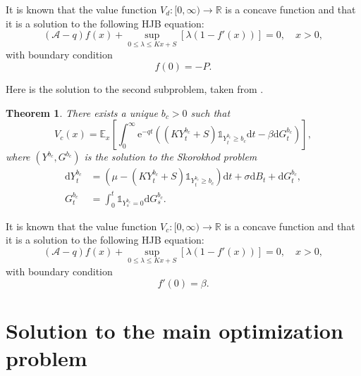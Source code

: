 \documentclass[11pt,reqno]{amsart}
\newtheorem{theorem}{Theorem}[section]
\newcommand{\E}{\mathbb{E}}
\newcommand{\e}{\mathrm{e}}
\newcommand{\reals}{\mathbb{R}}
\newcommand{\ind}{\mathds{1}}
\newcommand{\diff}{\mathrm{d}}
\renewcommand{\geq}{\geqslant}
\renewcommand{\leq}{\leqslant}
\begin{document}
It is known that the value function $V_d \colon [0,\infty) \to \reals$ is a concave function and that it is a solution to the following HJB equation:
\begin{equation}\label{HJB-d}
    (\mathcal{A}-q)f(x) + \sup_{0\leq\lambda\leq Kx+S}\left[\lambda(1-f'(x))\right] = 0, \quad x > 0,
\end{equation}
with boundary condition
\begin{equation}\label{bound-cond-d}
    f(0) = - P.
\end{equation}

Here is the solution to the second subproblem, taken from \cite{renaud-et-al_2023, mastromonaco_2025}.

\begin{theorem}\label{thm:sol-Jc}
    There exists a unique $b_c>0$ such that
    \begin{equation}\label{Vc-proba}
        V_c(x) = \E_x \left[\int_0^\infty \e^{-qt}\left((K Y^{b_c}_t + S)\ind_{Y^{b_c}_t\geq b_c} \diff t - \beta\diff G^{b_c}_t\right)\right],        
    \end{equation}
    where $(Y^{b_c},G^{b_c})$ is the solution to the Skorokhod problem
    \begin{align*}
        \diff Y^{b_c}_t &= \left(\mu - (K Y^{b_c}_t + S)\ind_{Y^{b_c}_t\geq b_c}\right)\diff t + \sigma \diff B_t + \diff G^{b_c}_t ,\\
            G^{b_c}_t &= \int_0^t \ind_{Y^{b_c}_s = 0} \diff G^{b_c}_s .
    \end{align*}
\end{theorem}

It is known that the value function $V_c \colon [0,\infty) \to \reals$ is a concave function and that it is a solution to the following HJB equation:
\begin{equation}\label{HJB-c}
    (\mathcal{A}-q)f(x) + \sup_{0\leq\lambda\leq Kx+S}\left[\lambda(1-f'(x))\right] = 0, \quad x > 0,
\end{equation}
with boundary condition
\begin{equation}\label{bound-cond-c}
    f'(0) = \beta.
\end{equation}

\section{Solution to the main optimization problem}\label{sec:sol-main}
\end{document}
